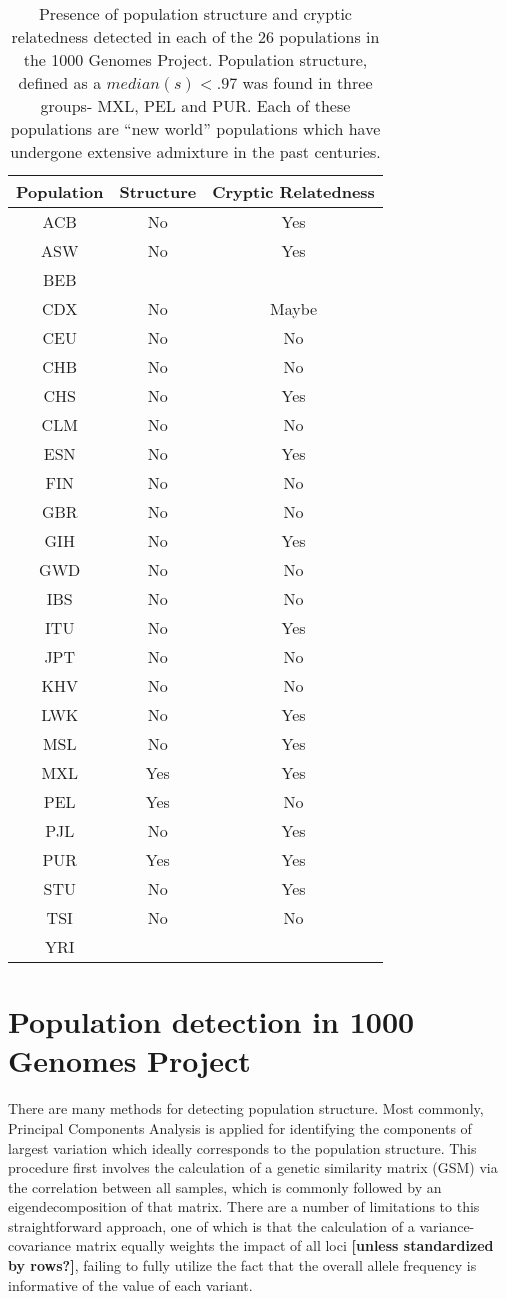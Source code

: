 \documentclass[english]{article}
\providecommand{\tabularnewline}{\\}
\begin{document}
\begin{table}


\begin{tabular}{|c|c|c|}
\hline 
Population & Structure & Cryptic Relatedness\tabularnewline
\hline 
\hline 
ACB & No & Yes\tabularnewline
\hline 
ASW & No & Yes\tabularnewline
\hline 
BEB &  & \tabularnewline
\hline 
CDX & No & Maybe\tabularnewline
\hline 
CEU & No & No\tabularnewline
\hline 
CHB & No & No\tabularnewline
\hline 
CHS & No & Yes\tabularnewline
\hline 
CLM & No & No\tabularnewline
\hline 
ESN & No & Yes\tabularnewline
\hline 
FIN & No & No\tabularnewline
\hline 
GBR & No & No\tabularnewline
\hline 
GIH & No & Yes\tabularnewline
\hline 
GWD & No & No\tabularnewline
\hline 
IBS & No & No\tabularnewline
\hline 
ITU & No & Yes\tabularnewline
\hline 
JPT & No & No\tabularnewline
\hline 
KHV & No & No\tabularnewline
\hline 
LWK & No & Yes\tabularnewline
\hline 
MSL & No & Yes\tabularnewline
\hline 
MXL & Yes & Yes\tabularnewline
\hline 
PEL & Yes & No\tabularnewline
\hline 
PJL & No & Yes\tabularnewline
\hline 
PUR & Yes & Yes\tabularnewline
\hline 
STU & No & Yes\tabularnewline
\hline 
TSI & No & No\tabularnewline
\hline 
YRI &  & \tabularnewline
\hline 
\end{tabular}\caption{Presence of population structure and cryptic relatedness detected
in each of the 26 populations in the 1000 Genomes Project. Population
structure, defined as a $median\left(s\right)<.97$ was found in three
groups- MXL, PEL and PUR. Each of these populations are ``new world''
populations which have undergone extensive admixture in the past centuries.}


\end{table}



\section*{Population detection in 1000 Genomes Project}

There are many methods for detecting population structure. Most commonly,
Principal Components Analysis \cite{price2006principal,price2010new}is
applied for identifying the components of largest variation which
ideally corresponds to the population structure. This procedure first
involves the calculation of a genetic similarity matrix (GSM) via
the correlation between all samples, which is commonly followed by
an eigendecomposition of that matrix. There are a number of limitations
to this straightforward approach, one of which is that the calculation
of a variance-covariance matrix equally weights the impact of all
loci \textbf{{[}unless standardized by rows?{]}}, failing to fully
utilize the fact that the overall allele frequency is informative
of the value of each variant.
\end{document}

